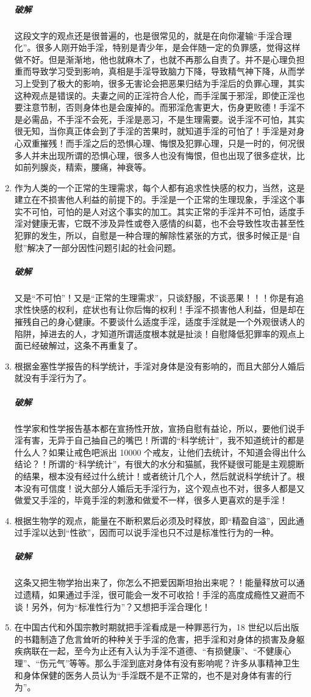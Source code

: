 \begin{enumerate}
    \subparagraph{破解} 这段文字的观点还是很普遍的，也是很常见的，就是在向你灌输“手淫合理化”。很多人刚开始手淫，特别是青少年，是会伴随一定的负罪感，觉得这样做不好。但是渐渐地，他也就麻木了，也就不再那么自责了。并不是心理负担重而导致学习受到影响，真相是手淫导致脑力下降，导致精气神下降，从而学习上受到了极大的影响，很多无害论会把恶果归结为手淫后的负罪心理，其实这种观点是错误的。夫妻之间的正淫符合人伦，而手淫属于邪淫，即使正淫也要注意节制，否则身体也是会废掉的。而邪淫危害更大，伤身更败德！手淫不是必需品，不手淫不会死，手淫是恶习，不是生理需要。说手淫不可怕，其实很无知，当你真正体会到了手淫的苦果时，就知道手淫的可怕了！手淫是对身心双重摧残！而手淫之后的恐惧心理、悔恨及犯罪心理，只是一时的，何况很多人并未出现所谓的恐惧心理，很多人也没有悔恨，但也出现了很多症状，比如前列腺炎，精索，腰痛，神衰等。
    \item 作为人类的一个正常的生理需求，每个人都有追求性快感的权力，当然，这是建立在不损害他人利益的前提下的。手淫是一个正常的生理现象，手淫这个事实不可怕，可怕的是人对这个事实的加工。其实正常的手淫并不可怕，适度手淫对健康无害，它既不涉及异性或卷入感情的纠葛，也不会导致性攻击甚至性犯罪的发生，所以，自慰是一种合理的解除性紧张的方式，很多时候正是“自慰”解决了一部分因性问题引起的社会问题。
    \subparagraph{破解} 又是“不可怕”！又是“正常的生理需求”，只谈舒服，不谈恶果！！！你是有追求性快感的权利，症状也有让你后悔的权利！手淫不损害他人利益，但是却在摧残自己的身心健康。不要谈什么适度手淫，适度手淫就是一个外观很诱人的陷阱，掉进去的人，才知道所谓适度根本就是扯淡！自慰降低犯罪率的观点上面已经破解过，这条不再重复了。
    \item 根据金塞性学报告的科学统计，手淫对身体是没有影响的，而且大部分人婚后就没有手淫行为了。
    \subparagraph{破解} 性学家和性学报告基本都在宣扬性开放，宣扬自慰有益论，所以，要他们说手淫有害，无异于自己抽自己的嘴巴！所谓的“科学统计”，我不知道统计的都是什么人？如果让戒色吧派出 10000 个戒友，让他们去统计，不知道会得出什么结论？！所谓的“科学统计”，有很大的水分和猫腻，我怀疑很可能是主观臆断的结果，根本没有经过什么统计！或者统计几个人，然后就说科学统计了。根本没有可信度！说大部分人婚后无手淫行为，这个观点也不对，很多人都是又做爱又手淫的，毕竟手淫的刺激和做爱不一样，很多人更喜欢的是手淫！
    \item 根据生物学的观点，能量在不断积累后必须及时释放，即“精盈自溢”，因此通过手淫以达到“性欲”，因而可以说手淫也只不过是标准性行为的一种。
    \subparagraph{破解} 这条又把生物学抬出来了，你怎么不把爱因斯坦抬出来呢？！能量释放可以通过遗精，如果通过手淫，很可能会一发不可收拾！手淫的高度成瘾性又避而不谈！另外，何为“标准性行为”？又想把手淫合理化！
    \item 在中国古代和外国宗教时期就把手淫看成是一种罪恶行为，18 世纪以后出版的书籍制造了危言耸听的种种关于手淫的危害，把手淫和对身体的损害及身躯疾病联在一起，至今为止还有入认为手淫不道德、“有损健康”、“不健康心理”、“伤元气”等等。那么手淫到底对身体有没有影响呢？许多从事精神卫生和身体保健的医务人员认为“手淫既不是不正常的，也不是对身体有害的行为”。

\end{enumerate}
